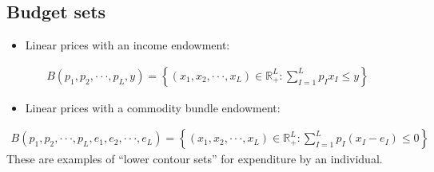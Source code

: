 \documentclass[letterpaper,10pt,english]{jupyterBook}
\begin{document}
\subsection{Budget sets}
\label{\detokenize{02.sets_numbers_coordinates_distances:budget-sets}}\begin{itemize}
\item {} 
\sphinxAtStartPar
Linear prices with an income endowment:

\end{itemize}
\begin{equation*}
\begin{split}B(p_1, p_2, · · · , p_L, y ) = \left\{
(x_1, x_2, · · · , x_L) \in \mathbb{R}_+^L : \sum_{I = 1}^{L} p_I x_I \leqslant y \right\}\end{split}
\end{equation*}\begin{itemize}
\item {} 
\sphinxAtStartPar
Linear prices with a commodity bundle endowment:

\end{itemize}
\begin{equation*}
\begin{split}B(p_1, p_2, · · · , p_L, e_1, e_2, · · · , e_L)
=
\left\{
(x_1, x_2, · · · , x_L) \in \mathbb{R}_+^L : \sum_{I = 1}^L p_I (x_I − e_I ) \leqslant 0
\right\}\end{split}
\end{equation*}
\sphinxAtStartPar
These are examples of “lower contour sets” for expenditure by an individual.

\sphinxAtStartPar
{}
\end{document}
